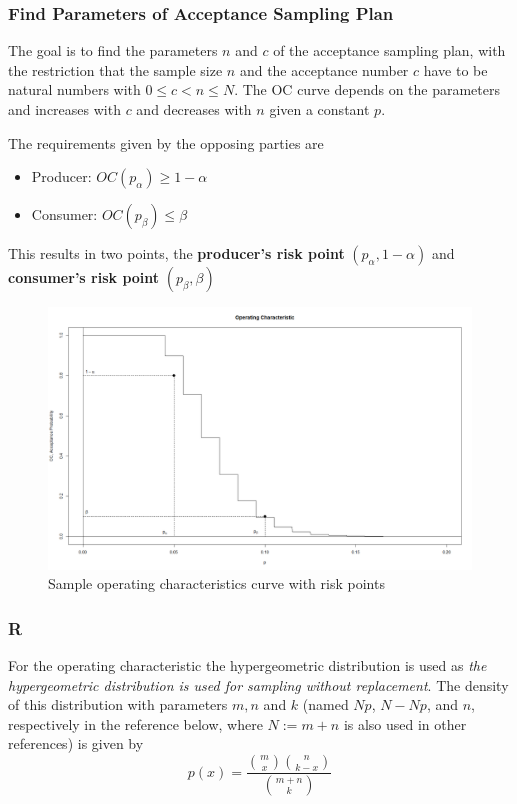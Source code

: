 \documentclass[11pt]{article}
\theoremstyle{definition}
\begin{document}
\subsubsection{Find Parameters of Acceptance Sampling Plan}
The goal is to find the parameters $n$ and $c$ of the acceptance sampling plan, with the restriction that the sample size $n$ and the acceptance number $c$ have to be natural numbers with $0\leq c<n \leq N$. The OC curve depends on the parameters and increases with $c$ and decreases with $n$ given a constant $p$.

The requirements given by the opposing parties are
\begin{itemize}
	\item Producer: $OC(p_\alpha) \geq 1-\alpha$
	\item Consumer: $OC(p_\beta) \leq \beta$
\end{itemize}
This results in two points, the \textbf{producer's risk point} $(p_\alpha, 1-\alpha)$ and \textbf{consumer's risk point} $(p_\beta, \beta)$
\begin{figure}[H]
	\centering
	\includegraphics[width=0.8\linewidth]{img/OC_curve_points.png}
	\caption{Sample operating characteristics curve with risk points}
\end{figure}

\subsubsection{R}
For the operating characteristic the hypergeometric distribution is used as \textit{the hypergeometric distribution is used for sampling without replacement}. The density of this distribution with parameters $m, n$ and $k$ (named $Np$, $N-Np$, and $n$, respectively in the reference below, where $N := m+n$ is also used in other references) is given by 
\begin{equation*}
	p(x) = \frac{\binom{m}{x}\binom{n}{k-x}}{\binom{m+n}{k}}
\end{equation*}
\end{document}
